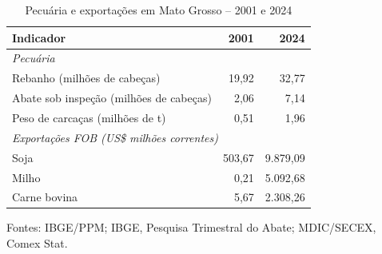 \begin{table}[htbp]
\centering
\small
\captionstyle{\centering}
\normalcaption
\caption{Pecuária e exportações em Mato Grosso -- 2001 e 2024}
\label{tab:h1-oferta-contexto}
\begin{tabular}{lrr}
\hline
Indicador & 2001 & 2024 \\
\hline
\multicolumn{3}{l}{\textit{Pecuária}} \\
Rebanho (milhões de cabeças) & 19,92 & 32,77 \\
Abate sob inspeção (milhões de cabeças) & 2,06 & 7,14 \\
Peso de carcaças (milhões de t) & 0,51 & 1,96 \\
\hline
\multicolumn{3}{l}{\textit{Exportações FOB (US\$ milhões correntes)}} \\
Soja & 503,67 & 9.879,09 \\
Milho & 0,21 & 5.092,68 \\
Carne bovina & 5,67 & 2.308,26 \\
\hline
\end{tabular}
\par\smallskip\begin{minipage}{\textwidth}\footnotesize
\centering
Fontes: IBGE/PPM; IBGE, Pesquisa Trimestral do Abate; MDIC/SECEX, Comex Stat.
\end{minipage}
\end{table}
